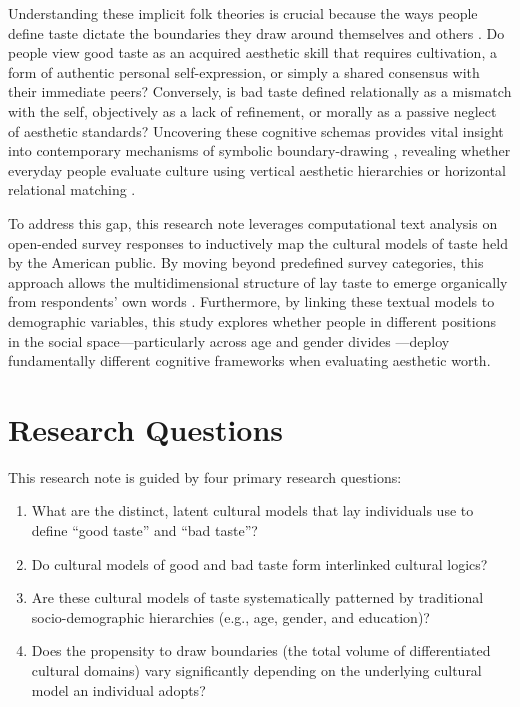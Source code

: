 \documentclass[12pt,letterpaper]{article}
\begin{document}
Understanding these implicit folk theories is crucial because the ways people define taste dictate the boundaries they draw around themselves and others \citep{vlegels2017music-360}. Do people view good taste as an acquired aesthetic skill that requires cultivation, a form of authentic personal self-expression, or simply a shared consensus with their immediate peers? Conversely, is bad taste defined relationally as a mismatch with the self, objectively as a lack of refinement, or morally as a passive neglect of aesthetic standards? Uncovering these cognitive schemas provides vital insight into contemporary mechanisms of symbolic boundary-drawing \citep{lamont2002study-18a}, revealing whether everyday people evaluate culture using vertical aesthetic hierarchies or horizontal relational matching \citep{tampubolon2008revisiting-3c2}.

To address this gap, this research note leverages computational text analysis on open-ended survey responses to inductively map the cultural models of taste held by the American public. By moving beyond predefined survey categories, this approach allows the multidimensional structure of lay taste to emerge organically from respondents' own words \citep{purhonen2023definitely-f03}. Furthermore, by linking these textual models to demographic variables, this study explores whether people in different positions in the social space---particularly across age and gender divides \citep{lizardo2015musical-8c6}---deploy fundamentally different cognitive frameworks when evaluating aesthetic worth.

\section{Research Questions}


This research note is guided by four primary research questions:
\begin{enumerate}
    \item What are the distinct, latent cultural models that lay individuals use to define ``good taste'' and ``bad taste''?
    \item Do cultural models of good and bad taste form interlinked cultural logics?
    \item Are these cultural models of taste systematically patterned by traditional socio-demographic hierarchies (e.g., age, gender, and education)?
    \item Does the propensity to draw boundaries (the total volume of differentiated cultural domains) vary significantly depending on the underlying cultural model an individual adopts?
\end{enumerate}
\end{document}

